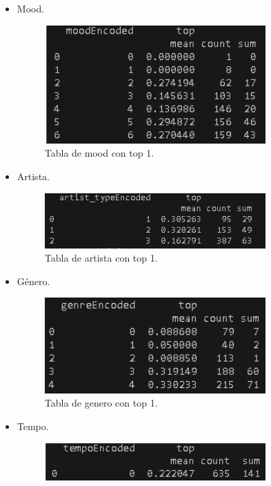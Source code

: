 \documentclass[a4paper,12pt]{article}
\begin{document}
\begin{itemize}
    \item Mood.
    \begin{figure}[H]
        \centering
        \includegraphics[width=0.8\textwidth]{20.png}
        \caption{Tabla de mood con top 1.}
        \label{fig:decision_tree}
    \end{figure}
    \item Artista.
    \begin{figure}[H]
        \centering
        \includegraphics[width=0.8\textwidth]{21.png}
        \caption{Tabla de artista con top 1.}
        \label{fig:decision_tree}
    \end{figure}
    \item Género.
    \begin{figure}[H]
        \centering
        \includegraphics[width=0.8\textwidth]{22.png}
        \caption{Tabla de genero con top 1.}
        \label{fig:decision_tree}
    \end{figure}
    \item Tempo.
    \begin{figure}[H]
        \centering
        \includegraphics[width=0.8\textwidth]{23.png}

\end{figure}
\end{itemize}
\end{document}
